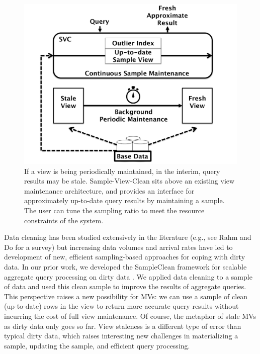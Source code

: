 \begin{figure}[t] \vspace{-2em}
\centering
 \includegraphics[scale=0.21]{figs/sys-arch.pdf} \vspace{-.25em}
 \caption{If a view is being periodically maintained, in the interim, query results may be stale. Sample-View-Clean sits above an existing view maintenance architecture, and provides an interface for approximately up-to-date query results by maintaining a sample. The user can tune the sampling ratio to meet the resource constraints of the system.\label{sys-arch}}\vspace{-1.75em}
\end{figure}

Data cleaning has been studied extensively in the literature (e.g., see Rahm and Do for a survey\cite{rahm2000data}) but increasing data volumes and arrival rates have led to development of new, efficient sampling-based approaches for coping with dirty data.   
In our prior work, we developed the SampleClean framework for scalable aggregate query processing on dirty data \cite{wang1999sample}.
We applied data cleaning to a sample of data and used this clean sample to improve the results of aggregate queries.
This perspective raises a new possibility for MVs: we can use a sample of clean (up-to-date) rows in the view to return more accurate query results without incurring the cost of full view maintenance.
Of course, the metaphor of stale MVs as dirty data only goes so far. 
View staleness is a different type of error than typical dirty data, which raises interesting new challenges in materializing a sample, updating the sample, and efficient query processing.

